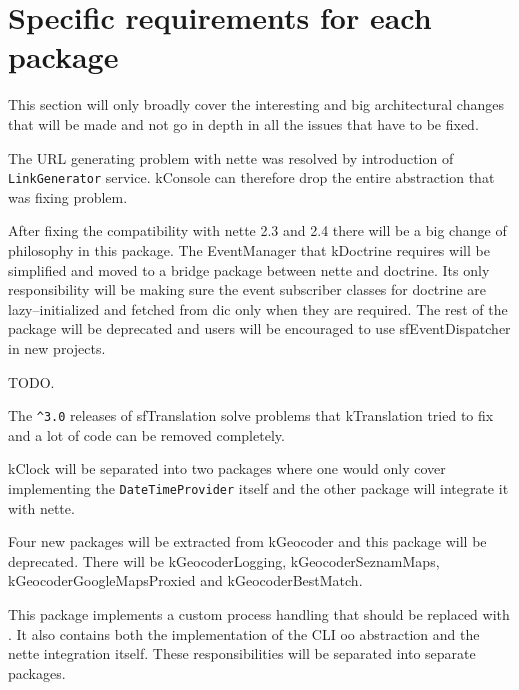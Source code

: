 \section{Specific requirements for each package} \label{sec:roadmap:each-package}

This section will only broadly cover the interesting and big architectural changes that will be made and not go in depth in all the issues that have to be fixed.


The URL generating problem with \gls{nette} was resolved by introduction of \lstinline{LinkGenerator} service. \gls{kConsole} can therefore drop the entire abstraction that was fixing problem.


After fixing the compatibility with \gls{nette} 2.3 and 2.4 there will be a big change of philosophy in this package. The EventManager that \gls{kDoctrine} requires will be simplified and moved to a bridge package between \gls{nette} and \gls{doctrine}. Its only responsibility will be making sure the event subscriber classes for \gls{doctrine} are lazy--initialized and fetched from \gls{dic} only when they are required. The rest of the package will be deprecated and users will be encouraged to use \gls{sfEventDispatcher} in new projects.




TODO.


The \lstinline{^3.0} releases of \gls{sfTranslation} solve problems that \gls{kTranslation} tried to fix and a lot of code can be removed completely.


\gls{kClock} will be separated into two packages where one would only cover implementing the \lstinline{DateTimeProvider} itself and the other package will integrate it with \gls{nette}.


Four new packages will be extracted from \gls{kGeocoder} and this package will be deprecated. There will be \gls{kGeocoderLogging}, \gls{kGeocoderSeznamMaps}, \gls{kGeocoderGoogleMapsProxied} and \gls{kGeocoderBestMatch}.


This package implements a custom process handling that should be replaced with . It also contains both the implementation of the CLI \gls{oo} abstraction and the \gls{nette} integration itself. These responsibilities will be separated into separate packages.
